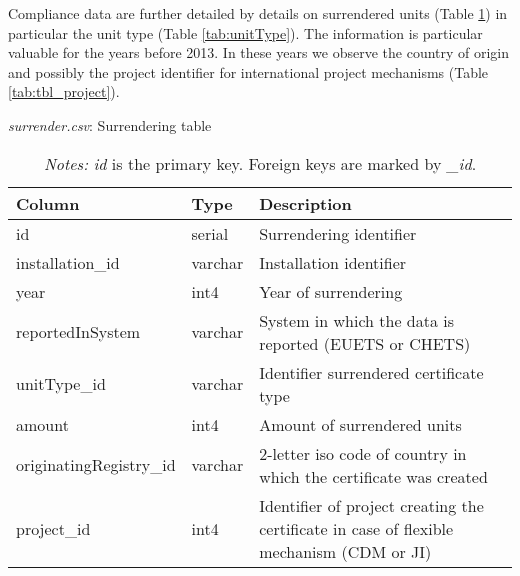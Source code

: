 \documentclass[authoryear]{elsarticle}
\begin{document}
Compliance data are further detailed by details on surrendered units (Table \ref{tab:tbl_surrender}) in particular the unit type (Table \ref{tab:unitType}). The information is particular valuable for the years before 2013. In these years we observe the country of origin and possibly the project identifier for international project mechanisms (Table \ref{tab:tbl_project}). 

\begin{table}[htbp]\scriptsize
	\caption{\textit{surrender.csv}: Surrendering table}\label{tab:tbl_surrender}
	\centering
	\begin{tabular*}{\textwidth}{@{}@{\extracolsep{\fill}} llp{8cm} @{}}
		\toprule
		\toprule
		\textbf{Column} & \textbf{Type}  & \textbf{Description} \\
		\midrule
		id    & serial & Surrendering identifier \\
		installation\_id & varchar & Installation identifier \\
		year  & int4  & Year of surrendering \\
		reportedInSystem & varchar  & System in which the data is reported (EUETS or CHETS) \\
		unitType\_id & varchar & Identifier surrendered certificate type \\
		amount & int4  & Amount of surrendered units \\
		originatingRegistry\_id & varchar & 2-letter iso code of country in which the certificate was created  \\
		project\_id & int4  & Identifier of project creating the certificate in case of flexible mechanism (CDM or JI) \\
		\bottomrule
		\bottomrule
	\end{tabular*}%
	\vspace{-3ex}
\caption*{\footnotesize \emph{Notes:} \textit{id} is the primary key. Foreign keys are marked by \textit{\_id}.}
\vspace{0ex}
\end{table}
\end{document}
